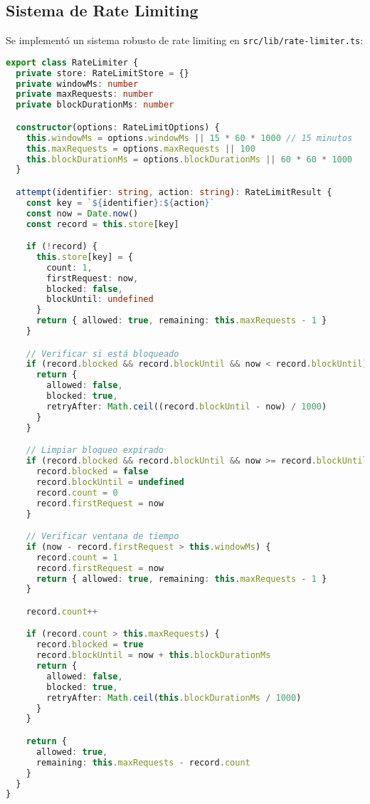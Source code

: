 \documentclass[12pt,a4paper]{article}
\begin{document}
\subsection{Sistema de Rate Limiting}

Se implementó un sistema robusto de rate limiting en \texttt{src/lib/rate-limiter.ts}:

\begin{lstlisting}[language=TypeScript, caption=Implementación de Rate Limiter]
export class RateLimiter {
  private store: RateLimitStore = {}
  private windowMs: number
  private maxRequests: number
  private blockDurationMs: number

  constructor(options: RateLimitOptions) {
    this.windowMs = options.windowMs || 15 * 60 * 1000 // 15 minutos
    this.maxRequests = options.maxRequests || 100
    this.blockDurationMs = options.blockDurationMs || 60 * 60 * 1000
  }

  attempt(identifier: string, action: string): RateLimitResult {
    const key = `${identifier}:${action}`
    const now = Date.now()
    const record = this.store[key]

    if (!record) {
      this.store[key] = {
        count: 1,
        firstRequest: now,
        blocked: false,
        blockUntil: undefined
      }
      return { allowed: true, remaining: this.maxRequests - 1 }
    }

    // Verificar si está bloqueado
    if (record.blocked && record.blockUntil && now < record.blockUntil) {
      return {
        allowed: false,
        blocked: true,
        retryAfter: Math.ceil((record.blockUntil - now) / 1000)
      }
    }

    // Limpiar bloqueo expirado
    if (record.blocked && record.blockUntil && now >= record.blockUntil) {
      record.blocked = false
      record.blockUntil = undefined
      record.count = 0
      record.firstRequest = now
    }

    // Verificar ventana de tiempo
    if (now - record.firstRequest > this.windowMs) {
      record.count = 1
      record.firstRequest = now
      return { allowed: true, remaining: this.maxRequests - 1 }
    }

    record.count++

    if (record.count > this.maxRequests) {
      record.blocked = true
      record.blockUntil = now + this.blockDurationMs
      return {
        allowed: false,
        blocked: true,
        retryAfter: Math.ceil(this.blockDurationMs / 1000)
      }
    }

    return {
      allowed: true,
      remaining: this.maxRequests - record.count
    }
  }
}
\end{lstlisting}
\end{document}
